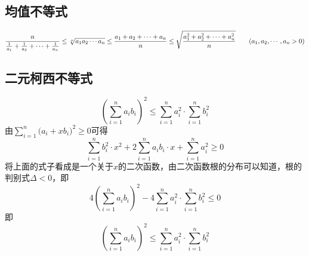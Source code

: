 \subsection{均值不等式}
\vspace*{-1.5em}
\begin{equation}
	\dfrac{n}{\textstyle \frac{1}{a_1} + \frac{1}{a_2} + \cdots + \frac{1}{a_n}} \le \sqrt[n]{a_1a_2\cdots a_n} \le \dfrac{a_1 + a_2 + \cdots + a_n}{n} \le \sqrt{\dfrac{a_1^2 + a_2^2 + \cdots + a_n^2}{n}}\qquad (a_1,a_2,\cdots,a_n > 0)
	\vspace*{1em}
\end{equation}


\subsection{二元柯西不等式}
\vspace*{-0.5em}
\begin{equation}
	\left( \sum_{i = 1}^n a_i b_i \right)^2 \le \sum_{i = 1}^n a_i^2 \cdot \sum_{i = 1}^n b_i^2
\end{equation}
\proof 由$\displaystyle \sum_{i=1}^n \big(a_i + xb_i \big)^2 \ge 0$可得\\[-1.5em]
$$
\sum_{i = 1}^n b_i^2 \cdot x^2 + 2 \sum_{i=1}^n a_ib_i \cdot x + \sum_{i = 1}^n a_i^2 \ge 0
$$
将上面的式子看成是一个关于$x$的二次函数，由二次函数根的分布可以知道，根的判别式$\Delta < 0$，即
$$
4\left( \sum_{i = 1}^n a_i b_i \right)^2 - 4\sum_{i = 1}^n a_i^2 \cdot \sum_{i = 1}^n b_i^2 \le 0
$$
即
$$
\left( \sum_{i = 1}^n a_i b_i \right)^2 \le \sum_{i = 1}^n a_i^2 \cdot \sum_{i = 1}^n b_i^2
$$






